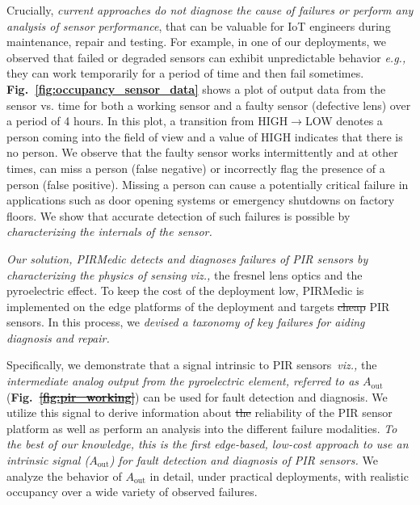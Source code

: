 \documentclass[manuscript,screen,review]{acmart} %
\newcommand{\eg}{{\it e.g.,}\xspace}
\newcommand{\viz}{{\it viz.,}\xspace}
\newcommand{\ci}{{\it (i) }}
\newcommand{\cii}{{\it (ii) }}
\newcommand{\ciii}{{\it (iii) }}
\newcommand{\aout}{$A_{\text{out}}$\xspace}
\newcommand{\sol}{{PIRMedic}\xspace}
\providecommand{\DIFadd}[1]{{\protect\color{blue}\uwave{#1}}} %
\providecommand{\DIFdel}[1]{{\protect\color{red}\sout{#1}}}                      %
\providecommand{\DIFaddbegin}{} %
\providecommand{\DIFaddend}{} %
\providecommand{\DIFdelbegin}{} %
\providecommand{\DIFdelend}{} %
\newcommand{\DIFscaledelfig}{0.5}
\newlength{\DIFdelgraphicswidth} %
\newlength{\DIFdelgraphicsheight} %
\newcommand{\DIFaddincludegraphics}[2][]{{\color{blue}\fbox{\DIFOincludegraphics[#1]{#2}}}} %
\newcommand{\DIFdelincludegraphics}[2][]{%
\sbox{\DIFdelgraphicsbox}{\DIFOincludegraphics[#1]{#2}}%
\settoboxwidth{\DIFdelgraphicswidth}{\DIFdelgraphicsbox} %
\settoboxtotalheight{\DIFdelgraphicsheight}{\DIFdelgraphicsbox} %
\scalebox{\DIFscaledelfig}{%
\parbox[b]{\DIFdelgraphicswidth}{\usebox{\DIFdelgraphicsbox}\\[-\baselineskip] \rule{\DIFdelgraphicswidth}{0em}}\llap{\resizebox{\DIFdelgraphicswidth}{\DIFdelgraphicsheight}{%
\setlength{\unitlength}{\DIFdelgraphicswidth}%
\begin{picture}(1,1)%
\thicklines\linethickness{2pt} %
{\color[rgb]{1,0,0}\put(0,0){\framebox(1,1){}}}%
{\color[rgb]{1,0,0}\put(0,0){\line( 1,1){1}}}%
{\color[rgb]{1,0,0}\put(0,1){\line(1,-1){1}}}%
\end{picture}%
}\hspace*{3pt}}} %
} %
\DeclareRobustCommand{\DIFaddbegin}{\DIFOaddbegin \let\includegraphics\DIFaddincludegraphics} %
\DeclareRobustCommand{\DIFaddend}{\DIFOaddend \let\includegraphics\DIFOincludegraphics} %
\DeclareRobustCommand{\DIFdelbegin}{\DIFOdelbegin \let\includegraphics\DIFdelincludegraphics} %
\DeclareRobustCommand{\DIFdelend}{\DIFOaddend \let\includegraphics\DIFOincludegraphics} %
\begin{document}
Crucially, \textit{current approaches do not diagnose the cause of failures or perform any analysis of sensor performance}, that can be valuable for IoT engineers during maintenance, repair and testing. For example, in one of our deployments, we observed that failed or degraded sensors can exhibit unpredictable behavior \eg they can work temporarily for a period of time and then fail sometimes. {\bfseries  Fig.~\ref{fig:occupancy_sensor_data}} shows a plot of output data from the sensor vs. time for both a working sensor and a faulty sensor (defective lens) over a period of 4 hours.
In this plot, a transition from HIGH$\rightarrow$LOW denotes a person coming into the field of view and a value of HIGH indicates that there is no person. We observe that the faulty sensor works intermittently and at other times, can miss a person (false negative) or incorrectly flag the presence of a person (false positive).
Missing a person can cause a potentially critical failure in applications such as door opening systems or emergency shutdowns on factory floors.
We show that accurate detection of such failures is possible by \textit{characterizing the internals of the sensor.}

\emph{Our solution, \sol detects and diagnoses failures of PIR sensors by characterizing the physics of sensing} \viz the fresnel lens optics and the pyroelectric effect. To keep the cost of the deployment low, \sol is implemented on the edge platforms of the deployment and targets \DIFdelbegin \DIFdel{cheap }\DIFdelend \DIFaddbegin \DIFadd{commodity }\DIFaddend PIR sensors.
In this process, we \emph{devised a taxonomy of key failures for aiding diagnosis and repair.} 


Specifically, we demonstrate that a signal intrinsic to PIR sensors~\viz the \textit{intermediate analog output from the pyroelectric element, referred to as \aout} ({\bfseries Fig.~\DIFdelbegin \DIFdel{\ref{fig:pir_working}}\DIFdelend \DIFaddbegin \DIFadd{\ref{fig:pir_sensing_pipeline}}\DIFaddend }) can be used for fault detection and diagnosis. We utilize this signal to derive information about \DIFdelbegin \DIFdel{the }\DIFdelend reliability of the PIR sensor platform as well as \DIFaddbegin \DIFadd{to }\DIFaddend perform an analysis into the different failure modalities. \textit{To the best of our knowledge, this is the first edge-based, low-cost approach to use an intrinsic signal (\aout) for fault detection and diagnosis of PIR sensors.} We analyze the behavior of \aout in detail, under practical deployments, with realistic occupancy
over a wide variety of observed failures. 
\end{document}
